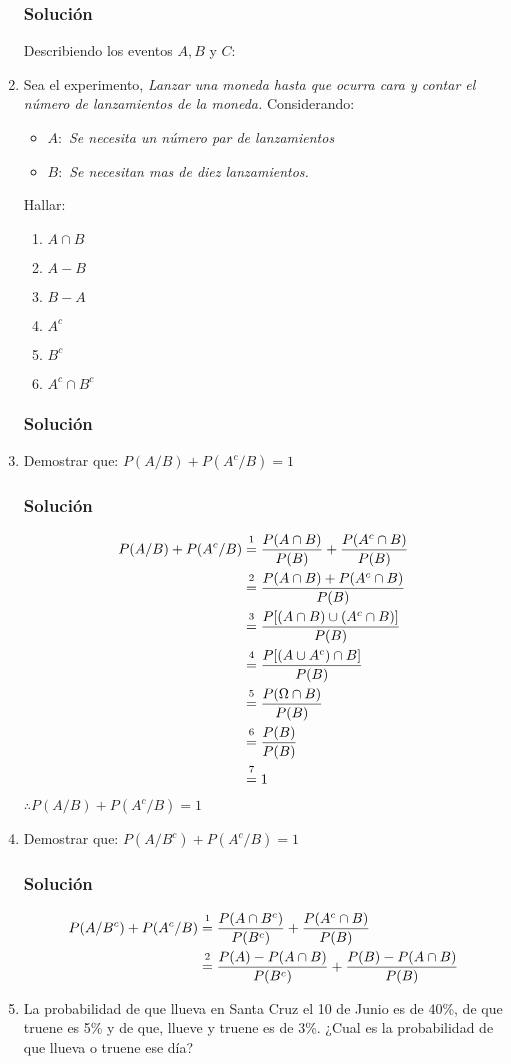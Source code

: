 \begin{enumerate}
\subsubsection{Solución}
Describiendo los eventos $A,B$ y $C$:
\item Sea el experimento, \textit{Lanzar una moneda hasta que ocurra cara y contar el número de lanzamientos de la moneda.}  Considerando:
\begin{itemize}
\item $A:$ \textit{Se necesita un número par de lanzamientos}
\item $B:$ \textit{Se necesitan mas de diez lanzamientos.}
\end{itemize}
Hallar:
\begin{enumerate}
\item $A\cap B$
\item $A-B$
\item $B-A$
\item $A^c$
\item $B^c$
\item $A^c \cap B^c$
\end{enumerate}
\subsubsection{Solución}
\item Demostrar que: $P(A/B)+P(A^c/B)=1$
\subsubsection{Solución}
\begin{align*}
P(A/B)+P(A^c/B) &\varstackrel{1}{=} \dfrac{P(A\cap B)}{P(B)} + \dfrac{P(A^c\cap B)}{P(B)} \\
  &\varstackrel{2}{=} \dfrac{P(A\cap B)+P(A^c\cap B)}{P(B)} \\
    &\varstackrel{3}{=} \dfrac{P[(A\cap B)\cup(A^c\cap B)]}{P(B)} \\
      &\varstackrel{4}{=} \dfrac{P[(A\cup A^c)\cap B]}{P(B)} \\
        &\varstackrel{5}{=} \dfrac{P(\Omega\cap B)}{P(B)} \\
           &\varstackrel{6}{=} \dfrac{P(B)}{P(B)} \\
                 &\varstackrel{7}{=} 1 \\
\end{align*}
$\therefore P(A/B)+P(A^c/B)=1$
\item Demostrar que: $P(A/B^c)+P(A^c/B)=1$
\subsubsection{Solución}
\begin{align*}
P(A/B^c)+P(A^c/B) &\varstackrel{1}{=} \dfrac{P(A\cap B^c)}{P(B^c)} + \dfrac{P(A^c\cap B)}{P(B)} \\
&\varstackrel{2}{=} \dfrac{P(A)-P(A\cap B)}{P(B^c)}+ \dfrac{P(B)-P(A\cap B)}{P(B)}
\end{align*}
\item La probabilidad de que llueva en Santa Cruz el 10 de Junio es de 40\%, de que truene es 5\% y de que, llueve y truene es de 3\%. ¿Cual es la probabilidad de que llueva o truene ese día?

\end{enumerate}
